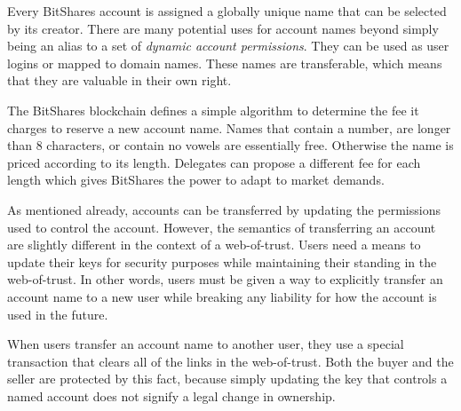 Every BitShares account is assigned a globally unique name that can be selected
by its creator. There are many potential uses for account names beyond simply
being an alias to a set of \emph{dynamic account permissions}. They can be used
as user logins or mapped to domain names. These names are transferable, which
means that they are valuable in their own right.

The BitShares blockchain defines a simple algorithm to determine the fee it
charges to reserve a new account name. Names that contain a number, are longer
than 8 characters, or contain no vowels are essentially free. Otherwise the
name is priced according to its length. Delegates can propose a different fee
for each length which gives BitShares the power to adapt to market demands.

As mentioned already, accounts can be transferred by updating the permissions
used to control the account. However, the semantics of transferring an account
are slightly different in the context of a web-of-trust. Users need a means to
update their keys for security purposes while maintaining their standing in the
web-of-trust. In other words, users must be given a way to explicitly transfer
an account name to a new user while breaking any liability for how the account
is used in the future.

When users transfer an account name to another user, they use a special
transaction that clears all of the links in the web-of-trust. Both the buyer
and the seller are protected by this fact, because simply updating the key that
controls a named account does not signify a legal change in ownership.

